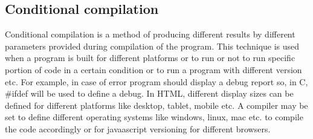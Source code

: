 \documentclass{sig-alternate}
\begin{document}
	\subsection{Conditional compilation}
	Conditional compilation is a method of producing different results by different parameters provided during compilation of the program. This technique is used when a program is built for different platforms or to run or not to run specific portion of code in a certain condition or to run a program with different version etc. For example, in case of error program should display a debug report so, in C, \#ifdef will be used to define a debug. In HTML, different display sizes can be defined for different platforms like desktop, tablet, mobile etc. A compiler may be set to define different operating systems like windows, linux, mac etc. to compile the code accordingly or for javaascript versioning for different browsers. 
	
\end{document}
